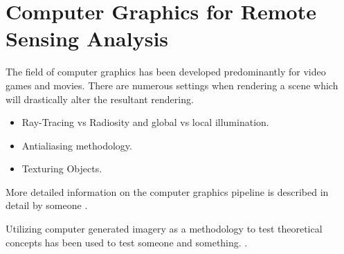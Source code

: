 \section{Computer Graphics for Remote Sensing Analysis}
The field of computer graphics has been developed predominantly for video games and movies.  There are numerous settings when rendering a scene which will drastically alter the resultant rendering.
\begin{itemize}
	\item Ray-Tracing vs Radiosity and global vs local illumination.
	\item Antialiasing methodology.
	\item Texturing Objects.
\end{itemize}

More detailed information on the computer graphics pipeline is described in detail by someone .  

Utilizing computer generated imagery as a methodology to test theoretical concepts has been used to test someone and something. .  